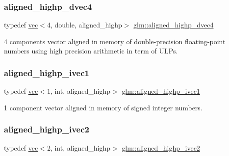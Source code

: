 \subsubsection{\texorpdfstring{aligned\+\_\+highp\+\_\+dvec4}{aligned\_highp\_dvec4}}
{\footnotesize\ttfamily typedef \hyperlink{structglm_1_1vec}{vec}$<$4, double, aligned\+\_\+highp$>$ \hyperlink{group__gtc__type__aligned_ga4b7b03b9178c6f0574c26181a054beec}{glm\+::aligned\+\_\+highp\+\_\+dvec4}}



4 components vector aligned in memory of double-\/precision floating-\/point numbers using high precision arithmetic in term of U\+L\+Ps. 

\mbox{\label{group__gtc__type__aligned_ga90ebad7148156f223d4743091c9870d5}} 
\subsubsection{\texorpdfstring{aligned\+\_\+highp\+\_\+ivec1}{aligned\_highp\_ivec1}}
{\footnotesize\ttfamily typedef \hyperlink{structglm_1_1vec}{vec}$<$1, int, aligned\+\_\+highp$>$ \hyperlink{group__gtc__type__aligned_ga90ebad7148156f223d4743091c9870d5}{glm\+::aligned\+\_\+highp\+\_\+ivec1}}



1 component vector aligned in memory of signed integer numbers. 

\mbox{\label{group__gtc__type__aligned_ga34105808a80ef5dabd7807997dfef328}} 
\subsubsection{\texorpdfstring{aligned\+\_\+highp\+\_\+ivec2}{aligned\_highp\_ivec2}}
{\footnotesize\ttfamily typedef \hyperlink{structglm_1_1vec}{vec}$<$2, int, aligned\+\_\+highp$>$ \hyperlink{group__gtc__type__aligned_ga34105808a80ef5dabd7807997dfef328}{glm\+::aligned\+\_\+highp\+\_\+ivec2}}



